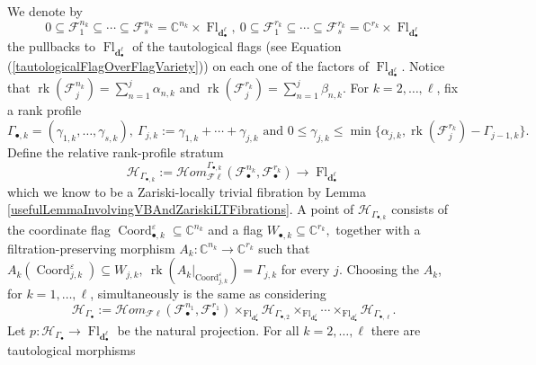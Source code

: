 \documentclass{amsart}
\theoremstyle{plain}
\numberwithin{equation}{section}
\theoremstyle{definition}
\theoremstyle{remark}
\begin{document}
	\\
	\\
	We denote by
	$$
	0\subseteq \mathcal F^{n_k}_1\subseteq\cdots\subseteq
	\mathcal F^{n_k}_s=
	\mathbb C^{n_k}\times\operatorname{Fl}_{\mathbf{d}^\ell_\bullet },\ 
	0\subseteq \mathcal F^{r_k}_1\subseteq\cdots\subseteq
	\mathcal F^{r_k}_s=
	\mathbb C^{r_k}\times\operatorname{Fl}_{\mathbf{d}^\ell_\bullet }
	$$
	the pullbacks to $\operatorname{Fl}_{\mathbf{d}^\ell_\bullet }$ of the tautological flags (see Equation (\ref{tautologicalFlagOverFlagVariety})) on each one of the factors of $\operatorname{Fl}_{\mathbf{d}^\ell_\bullet}$. Notice that $\operatorname{rk}(\mathcal{F}_j^{n_k})=\sum_{n=1}^j\alpha_{n,k}$ and $\operatorname{rk}(\mathcal{F}_j^{r_k})=\sum_{n=1}^j\beta_{n,k}$. For $k=2,\ldots,\ell$, fix a rank profile
	\begin{equation}\label{rankProfileDef}
	\Gamma_{\bullet,k}=(\gamma_{1,k},\ldots,\gamma_{s,k}), \  \Gamma_{j,k}:=\gamma_{1,k}+\cdots+\gamma_{j,k}\text{ and } 0\leq \gamma_{j,k}\leq \min\{\alpha_{j,k},\operatorname{rk}(\mathcal{F}_j^{r_k})-\Gamma_{j-1,k}\}.
	\end{equation}
	Define the relative rank-profile stratum
	$$
	\mathcal{H}_{\Gamma_{\bullet,k}}:=
	\mathcal H om_{\mathcal F\ell}^{\Gamma_{\bullet,k}}
	(\mathcal F^{n_k}_\bullet,\mathcal F^{r_k}_\bullet)
	\longrightarrow \operatorname{Fl}_{\mathbf{d}^\ell_\bullet }
	$$
	which we know to be a Zariski-locally trivial fibration by Lemma \ref{usefulLemmaInvolvingVBAndZariskiLTFibrations}. 
	A point of $\mathcal{H}_{\Gamma_{\bullet,k}}$ consists of the coordinate flag
	$\operatorname{Coord}_{\bullet,k}^{\varepsilon}\subseteq \mathbb{C}^{n_k}$ and a flag $ W_{\bullet,k}\subseteq \mathbb C^{r_k},$
	together with a filtration-preserving morphism $A_k:\mathbb C^{n_k}\to \mathbb C^{r_k}$ such that
	$A_k(\operatorname{Coord}_{j,k}^{\varepsilon})\subseteq W_{j,k}, \ \operatorname{rk}(A_k|_{\operatorname{Coord}_{j,k}^{\varepsilon}})=\Gamma_{j,k}$ for every $j$. Choosing the $A_k$, for $k=1,\ldots,\ell$, simultaneously is the same as considering 
	$$
	\mathcal{H}_{\Gamma_\bullet}
	:=
	\mathcal{H}om_{\mathcal{F}\ell}(\mathcal{F}^{n_1}_{\bullet},\mathcal{F}^{r_1}_\bullet)
	\times_{\operatorname{Fl}_{\mathbf{d}^\ell_\bullet }}
	\mathcal{H}_{\Gamma_{\bullet,2}}
	\times_{\operatorname{Fl}_{\mathbf{d}^\ell_\bullet }}\cdots\times_{\operatorname{Fl}_{\mathbf{d}^\ell_\bullet }}
	\mathcal{H}_{\Gamma_{\bullet,\ell}}.
	$$
	Let $p:\mathcal{H}_{\Gamma_\bullet}\to \operatorname{Fl}_{\mathbf{d}^\ell_\bullet }$
	be the natural projection. For all $k=2,\ldots,\ell$ there are tautological morphisms
\end{document}
